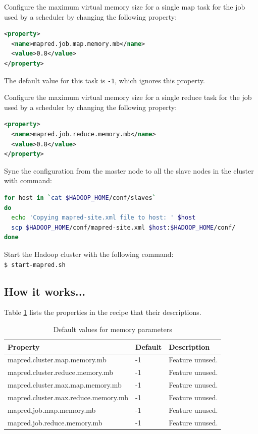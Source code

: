 Configure the maximum virtual memory size for a single map task for the job used by a scheduler by changing the following property:
\lstset{style=bashstyle}
\begin{lstlisting}[language=XML]
<property>
  <name>mapred.job.map.memory.mb</name>
  <value>0.8</value>
</property>
\end{lstlisting}

The default value for this task is \verb|-1|, which ignores this property.

Configure the maximum virtual memory size for a single reduce task for the job used by a scheduler by changing the following property:
\lstset{style=bashstyle}
\begin{lstlisting}[language=XML]
<property>
  <name>mapred.job.reduce.memory.mb</name>
  <value>0.8</value>
</property>
\end{lstlisting}

Sync the configuration from the master node to all the slave nodes in the cluster with command:
\lstset{style=bashstyle}
\begin{lstlisting}[language=bash]
for host in `cat $HADOOP_HOME/conf/slaves`
do
  echo 'Copying mapred-site.xml file to host: ' $host
  scp $HADOOP_HOME/conf/mapred-site.xml $host:$HADOOP_HOME/conf/
done
\end{lstlisting}

Start the Hadoop cluster with the following command: \\
\verb|$ start-mapred.sh|

\subsection*{How it works...}
Table \ref{tbl:memoryconfig.default} lists the properties in the recipe that their descriptions.
\begin{table}[ht]
  \centering
  \begin{tabular}{lll}
    \toprule
    \textbf{Property} &  \textbf{Default} &  \textbf{Description} \\ \midrule
      mapred.cluster.map.memory.mb & -1 & Feature unused. \\
      mapred.cluster.reduce.memory.mb & -1 & Feature unused. \\
      mapred.cluster.max.map.memory.mb & -1 & Feature unused. \\
      mapred.cluster.max.reduce.memory.mb & -1 & Feature unused. \\
      mapred.job.map.memory.mb & -1 & Feature unused. \\
      mapred.job.reduce.memory.mb & -1 & Feature unused. \\ \bottomrule
  \end{tabular}
  \caption{Default values for memory parameters}\label{tbl:memoryconfig.default}
\end{table}

